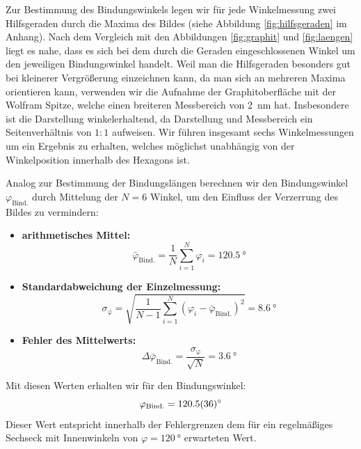 \documentclass[10pt, a4paper]{article}
\begin{document}
Zur Bestimmung des Bindungswinkels legen wir für jede Winkelmessung zwei Hilfsgeraden durch die Maxima des Bildes (siehe Abbildung \ref{fig:hilfsgeraden} im Anhang).
Nach dem Vergleich mit den Abbildungen \ref{fig:graphit} und \ref{fig:laengen} liegt es nahe, dass es sich bei dem durch die Geraden eingeschlossenen Winkel um den jeweiligen Bindungswinkel handelt.
Weil man die Hilfsgeraden besonders gut bei kleinerer Vergrößerung einzeichnen kann, da man sich an mehreren Maxima orientieren kann, verwenden wir die Aufnahme der Graphitoberfläche mit der Wolfram Spitze, welche einen breiteren Messbereich von \SI{2}{\nano\metre} hat.
Insbesondere ist die Darstellung winkelerhaltend, da Darstellung und Messbereich ein Seitenverhältnis von $1:1$ aufweisen.
Wir führen insgesamt sechs Winkelmessungen um ein Ergebnis zu erhalten, welches möglichst unabhängig von der Winkelposition innerhalb des Hexagons ist.



Analog zur Bestimmung der Bindungslängen berechnen wir den Bindungswinkel $\varphi_\mathrm{Bind.}$ durch Mittelung der $N = 6$ Winkel, um den Einfluss der Verzerrung des Bildes zu vermindern:
\begin{itemize}
  \item \textbf{arithmetisches Mittel:}
  \begin{equation}
    \bar{\varphi}_\mathrm{Bind.} = \frac{1}{N} \sum_{i=1}^N \varphi_i = \SI{120,5}{\degree}
  \end{equation}
  
  \item \textbf{Standardabweichung der Einzelmessung:}
  \begin{equation}
    \sigma_\mathrm{\varphi} = \sqrt{\frac{1}{N-1} \sum_{i=1}^N (\varphi_i - \bar{\varphi}_\mathrm{Bind.})^2} = \SI{8,6}{\degree}
  \end{equation}
  
  \item \textbf{Fehler des Mittelwerts:}
  \begin{equation}
    \Delta \bar{\varphi}_\mathrm{Bind.} = \frac{\sigma_\mathrm{\varphi}}{\sqrt{N}} = \SI{3,6}{\degree}
  \end{equation}
\end{itemize}
Mit diesen Werten erhalten wir für den Bindungswinkel:
\begin{equation*}
  \varphi_\mathrm{Bind.} = \SI{120,5 +- 3,6}{\degree}
\end{equation*}
Dieser Wert entspricht innerhalb der Fehlergrenzen dem für ein regelmäßiges Sechseck mit Innenwinkeln von $\varphi = \SI{120}{\degree}$ erwarteten Wert.
\end{document}
